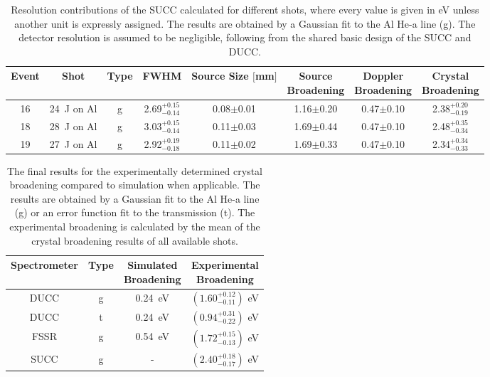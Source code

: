 \begin{table}[H]
	\centering
	\caption{Resolution contributions of the SUCC calculated for different shots, where every value is given in eV unless another unit is expressly assigned. The results are obtained by a Gaussian fit to the Al He-a line (g). The detector resolution is assumed to be negligible, following from the shared basic design of the SUCC and DUCC.}
	\vspace{0.05cm}
	\renewcommand{\arraystretch}{1.5}
	\centering
	\begin{tabular}{|c|c|c|c|c|c|c|c|} 
		\hline
		Event & Shot & Type & FWHM & \makecell{Source Size \\ $[$mm$]$} & \makecell{Source \\ Broadening} & \makecell{Doppler \\ Broadening} & \makecell{Crystal \\ Broadening} \\ 
		[0.5ex]
		\hline\hline
		16 & \SI{24}{\joule} on Al & g & 2.69$^{+0.15}_{-0.14}$ & 0.08$\pm$0.01 & 1.16$\pm$0.20 & 0.47$\pm$0.10 & 
		2.38$^{+0.20}_{-0.19}$ \\ 
		[0.5ex]
		\hline
		18 & \SI{28}{\joule} on Al & g & 3.03$^{+0.15}_{-0.14}$ & 0.11$\pm$0.03 & 1.69$\pm$0.44 & 0.47$\pm$0.10 & 
		2.48$^{+0.35}_{-0.34}$ \\ 
		[0.5ex]
		\hline
		19 & \SI{27}{\joule} on Al & g & 2.92$^{+0.19}_{-0.18}$ & 0.11$\pm$0.02 & 1.69$\pm$0.33 & 0.47$\pm$0.10 & 
		2.34$^{+0.34}_{-0.33}$ \\ 
		[0.5ex]
		\hline
	\end{tabular}
	\label{Table: SUCC resolution}
\end{table}


\begin{table}[H]
	\centering
	\caption{The final results for the experimentally determined crystal broadening compared to simulation when applicable. The results are obtained by a Gaussian fit to the Al He-a line (g) or an error function fit to the transmission (t). The experimental broadening is calculated by the mean of the crystal broadening results of all available shots.}
	\vspace{0.05cm}
	\renewcommand{\arraystretch}{1.5}
	\centering
	\begin{tabular}{|c|c|c|c|} 
		\hline
		Spectrometer & Type & \makecell{Simulated \\ Broadening} & \makecell{Experimental \\ Broadening} \\ 
		[0.5ex]
		\hline\hline
		DUCC & g &  \SI{0.24}{\electronvolt} & $\left(1.60^{+0.12}_{-0.11}\right)$ eV \\ 
		[0.5ex]
		\hline
		DUCC & t & \SI{0.24}{\electronvolt} & $\left(0.94^{+0.31}_{-0.22}\right)$ eV \\ 
		[0.5ex]
		\hline
		FSSR & g & \SI{0.54}{\electronvolt} & $\left(1.72^{+0.15}_{-0.13}\right)$ eV \\ 
		[0.5ex]
		\hline
		SUCC & g & - & $\left(2.40^{+0.18}_{-0.17}\right)$ eV \\ 
		[0.5ex]
		\hline
	\end{tabular}
	\label{Table: Final Resolutions}
\end{table}

